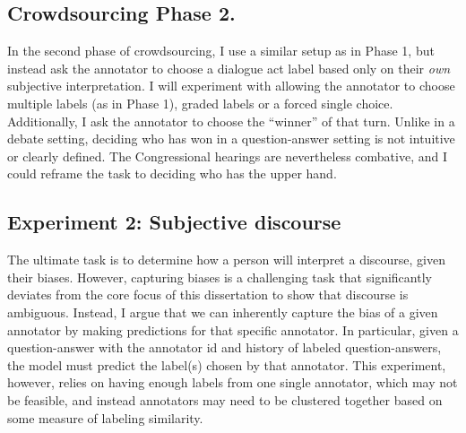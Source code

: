 \subsection{Crowdsourcing Phase 2.}
\label{subsec:phase2}
In the second phase of crowdsourcing, I use a similar setup as in Phase 1, but instead ask the annotator to choose a dialogue act label based only on their \emph{own} subjective interpretation. I will experiment with allowing the annotator to choose multiple labels (as in Phase 1), graded labels or a forced single choice. Additionally, I ask the annotator to choose the ``winner'' of that turn. Unlike in a debate setting, deciding who has won in a question-answer setting is not intuitive or clearly defined. The Congressional hearings are nevertheless combative, and I could reframe the task to deciding who has the upper hand. 

\subsection{Experiment 2: Subjective discourse} The ultimate task is to determine how a person will interpret a discourse, given their biases. However, capturing biases is a  challenging task that significantly deviates from the core focus of this dissertation to show that discourse is ambiguous. Instead, I argue that we can inherently capture the bias of a given annotator by making predictions for that specific annotator. In particular, given a question-answer with the annotator id and history of labeled question-answers, the model must predict the label(s) chosen by that annotator. This experiment, however, relies on having enough labels from one single annotator, which may not be feasible, and instead annotators may need to be clustered together based on some measure of labeling similarity.

